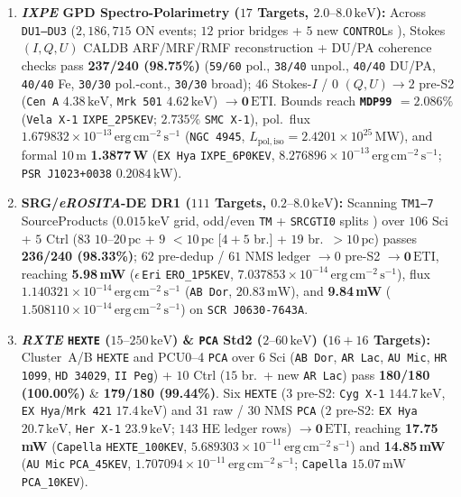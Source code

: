 \documentclass[twocolumn,10pt]{article}
\begin{document}
\begin{enumerate}\setlength{\itemsep}{2pt}\setlength{\parskip}{0pt}
  \item \textbf{\textit{IXPE} GPD Spectro-Polarimetry ($17$ Targets, $2.0\text{--}8.0\,\mathrm{keV}$):} Across \texttt{DU1--DU3} ($2{,}186{,}715$ ON events; $12$ prior bridges + $5$ new \texttt{CONTROL}s \cite{Weisskopf2022,Kislat2015}), Stokes $(I, Q, U)$ CALDB ARF/MRF/RMF reconstruction + DU/PA coherence checks pass \textbf{237/240 (98.75\%)} (\texttt{59/60} pol., \texttt{38/40} unpol., \texttt{40/40} DU/PA, \texttt{40/40} Fe, \texttt{30/30} pol.-cont., \texttt{30/30} broad); $46$ Stokes-$I$ / $0$ $(Q, U)\rightarrow 2$ pre-S2 (\texttt{Cen\,A} $4.38\,\mathrm{keV}$, \texttt{Mrk\,501} $4.62\,\mathrm{keV}$) $\rightarrow \mathbf{0\,\mathrm{ETI}}$. Bounds reach \textbf{\texttt{MDP99} $= 2.086\%$} (\texttt{Vela\,X-1} \texttt{IXPE\_2P5KEV}; $2.735\%$ \texttt{SMC\,X-1}), pol.\ flux $1.679832\times 10^{-13}\,\mathrm{erg\,cm^{-2}\,s^{-1}}$ (\texttt{NGC\,4945}, $L_{\mathrm{pol,iso}} = 2.4201\times 10^{25}\,\mathrm{MW}$), and formal $10\,\text{m}$ \textbf{1.3877\,W} (\texttt{EX\,Hya} \texttt{IXPE\_6P0KEV}, $8.276896\times 10^{-13}\,\mathrm{erg\,cm^{-2}\,s^{-1}}$; \texttt{PSR\,J1023+0038} $0.2084\,\mathrm{kW}$).
  \item \textbf{SRG/\textit{eROSITA}-DE DR1 ($111$ Targets, $0.2\text{--}8.0\,\mathrm{keV}$):} Scanning \texttt{TM1--7} SourceProducts ($0.015\,\mathrm{keV}$ grid, odd/even \texttt{TM} + \texttt{SRCGTI0} splits \cite{Predehl2021,Merloni2024,Freund2024}) over $106$ Sci + $5$ Ctrl ($83$ $10\text{--}20\,\text{pc}$ + $9$ $<10\,\text{pc}$ [$4+5$ br.] + $19$ br.\ $>10\,\text{pc}$) passes \textbf{236/240 (98.33\%)}; $62$ pre-dedup / $61$ NMS ledger $\rightarrow 0$ pre-S2 $\rightarrow \mathbf{0\,\mathrm{ETI}}$, reaching \textbf{5.98\,mW} ($\epsilon$\,\texttt{Eri} \texttt{ERO\_1P5KEV}, $7.037853\times 10^{-14}\,\mathrm{erg\,cm^{-2}\,s^{-1}}$), flux $1.140321\times 10^{-14}\,\mathrm{erg\,cm^{-2}\,s^{-1}}$ (\texttt{AB\,Dor}, $20.83\,\mathrm{mW}$), and \textbf{9.84\,mW} ($1.508110\times 10^{-14}\,\mathrm{erg\,cm^{-2}\,s^{-1}}$) on \texttt{SCR\,J0630-7643A}.
  \item \textbf{\textit{RXTE} \texttt{HEXTE} ($15\text{--}250\,\mathrm{keV}$) \& \texttt{PCA} Std2 ($2\text{--}60\,\mathrm{keV}$) ($16+16$ Targets):} Cluster~A/B \texttt{HEXTE} \cite{Rothschild1998} and PCU0--4 \texttt{PCA} \cite{Jahoda2006} over $6$ Sci (\texttt{AB\,Dor}, \texttt{AR\,Lac}, \texttt{AU\,Mic}, \texttt{HR\,1099}, \texttt{HD\,34029}, \texttt{II\,Peg}) + $10$ Ctrl ($15$ br.\ + new \texttt{AR\,Lac}) pass \textbf{180/180 (100.00\%)} \& \textbf{179/180 (99.44\%)}. Six \texttt{HEXTE} ($3$ pre-S2: \texttt{Cyg\,X-1} $144.7\,\mathrm{keV}$, \texttt{EX\,Hya}/\texttt{Mrk\,421} $17.4\,\mathrm{keV}$) and $31$ raw / $30$ NMS \texttt{PCA} ($2$ pre-S2: \texttt{EX\,Hya} $20.7\,\mathrm{keV}$, \texttt{Her\,X-1} $23.9\,\mathrm{keV}$; $143$ HE ledger rows) $\rightarrow \mathbf{0\,\mathrm{ETI}}$, reaching \textbf{17.75\,mW} (\texttt{Capella} \texttt{HEXTE\_100KEV}, $5.689303\times 10^{-11}\,\mathrm{erg\,cm^{-2}\,s^{-1}}$) and \textbf{14.85\,mW} (\texttt{AU\,Mic} \texttt{PCA\_45KEV}, $1.707094\times 10^{-11}\,\mathrm{erg\,cm^{-2}\,s^{-1}}$; \texttt{Capella} $15.07\,\mathrm{mW}$ \texttt{PCA\_10KEV}).

\end{enumerate}
\end{document}
